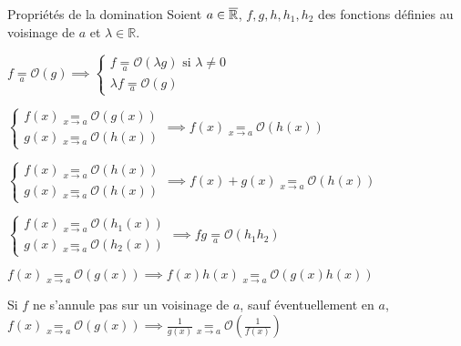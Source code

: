     \begin{prop}{Propriétés de la domination}{}
        Soient $a \in \overline{\mathbb{R}}$, $f,g,h,h_1,h_2$ des fonctions définies au voisinage de $a$ et $\lambda \in \mathbb{R}$.
    
        \begin{alors}
            \item $f \underset{a}{=} \mathcal{O}(g) \implies \left\{ \begin{array}{l}
                f \underset{a}{=} \mathcal{O}(\lambda g) \text{ si } \lambda \neq 0 \\
                \lambda f \underset{a}{=} \mathcal{O}(g)
            \end{array}\right.$
            \item $ \left\{ \begin{array}{l}
                f(x) \underset{x \rightarrow a}{=} \mathcal{O}(g(x)) \\
                g(x) \underset{x \rightarrow a}{=} \mathcal{O}(h(x))
            \end{array} \right. \implies f(x) \underset{x \rightarrow a}{=} \mathcal{O}(h(x))$
            \item $\left\{ \begin{array}{l}
                f(x) \underset{x \rightarrow a}{=} \mathcal{O}(h(x)) \\
                g(x) \underset{x \rightarrow a}{=} \mathcal{O}(h(x))
            \end{array} \right. \implies f(x) + g(x) \underset{x \rightarrow a}{=} \mathcal{O}(h(x))$
            \item $\left\{ \begin{array}{l}
                f(x) \underset{x \rightarrow a}{=} \mathcal{O}(h_1(x)) \\
                g(x) \underset{x \rightarrow a}{=} \mathcal{O}(h_2(x))
            \end{array} \right. \implies fg \underset{a}{=} \mathcal{O}(h_1 h_2)$
            \item $ f(x) \underset{x \rightarrow a}{=} \mathcal{O}(g(x)) \implies f(x) h(x) \underset{x \rightarrow a}{=} \mathcal{O}(g(x) h(x))$
            \item Si $f$ ne s’annule pas sur un voisinage de $a$, sauf éventuellement en $a$, \\ $ f(x) \underset{x \rightarrow a}{=} \mathcal{O}(g(x)) \implies \frac{1}{g(x)} \underset{x \rightarrow a}{=} \mathcal{O}\left(\frac{1}{f(x)}\right)$
        \end{alors}
    \end{prop}
    
